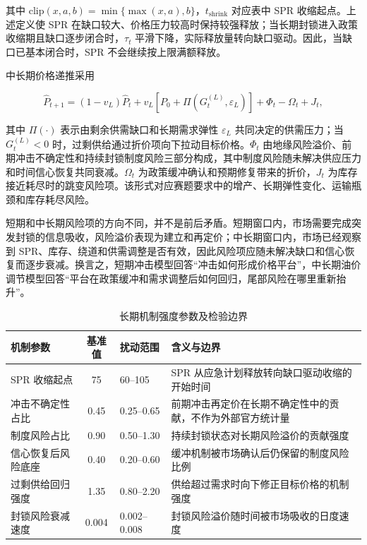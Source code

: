 其中 \(\mathrm{clip}(x,a,b)=\min\{\max(x,a),b\}\)，\(t_{\mathrm{shrink}}\) 对应表中 SPR 收缩起点。上述定义使 SPR 在缺口较大、价格压力较高时保持较强释放；当长期封锁进入政策收缩期且缺口逐步闭合时，\(\tau_t\) 平滑下降，实际释放量转向缺口驱动。因此，当缺口已基本闭合时，SPR 不会继续按上限满额释放。

中长期价格递推采用

\begin{equation}
\hat P_{t+1}
=
(1-v_L)\hat P_t
+v_L
\left[
P_0+\Pi(G_t^{(L)},\varepsilon_L)
\right]
+\Phi_t-\Omega_t+J_t ,
\end{equation}

其中 $\Pi(\cdot)$ 表示由剩余供需缺口和长期需求弹性 $\varepsilon_L$ 共同决定的供需压力；当 $G_t^{(L)}<0$ 时，过剩供给通过折价项向下拉动目标价格。$\Phi_t$ 由地缘风险溢价、前期冲击不确定性和持续封锁制度风险三部分构成，其中制度风险随未解决供应压力和时间信心恢复共同衰减。$\Omega_t$ 为政策缓冲确认和预期修复带来的折价，$J_t$ 为库存接近耗尽时的跳变风险项。该形式对应赛题要求中的增产、长期弹性变化、运输瓶颈和库存耗尽风险。

短期和中长期风险项的方向不同，并不是前后矛盾。短期窗口内，市场需要完成突发封锁的信息吸收，风险溢价表现为建立和再定价；中长期窗口内，市场已经观察到 SPR、库存、绕道和供需调整是否有效，因此风险项应随未解决缺口和信心恢复而逐步衰减。换言之，短期冲击模型回答“冲击如何形成价格平台”，中长期油价调节模型回答“平台在政策缓冲和需求调整后如何回归，尾部风险在哪里重新抬升”。

\begin{table}[!htbp]
\centering
\caption{长期机制强度参数及检验边界}
\begin{tabularx}{\linewidth}{Y S[table-format=2.3] L{2.2cm} Y}
\toprule
机制参数 & {基准值} & 扰动范围 & 含义与边界 \\
\midrule
SPR 收缩起点 & 75 & 60--105 & SPR 从应急计划释放转向缺口驱动收缩的开始时间 \\
冲击不确定性占比 & 0.45 & 0.25--0.65 & 前期冲击再定价在长期不确定性中的贡献，不作为外部官方统计量 \\
制度风险占比 & 0.90 & 0.50--1.30 & 持续封锁状态对长期风险溢价的贡献强度 \\
信心恢复后风险底座 & 0.40 & 0.20--0.60 & 缓冲机制被市场确认后仍保留的制度风险比例 \\
过剩供给回归强度 & 1.35 & 0.80--2.20 & 供给超过需求时向下修正目标价格的机制强度 \\
封锁风险衰减速度 & 0.004 & 0.002--0.008 & 封锁风险溢价随时间被市场吸收的日度速度 \\
\bottomrule
\end{tabularx}
\end{table}

